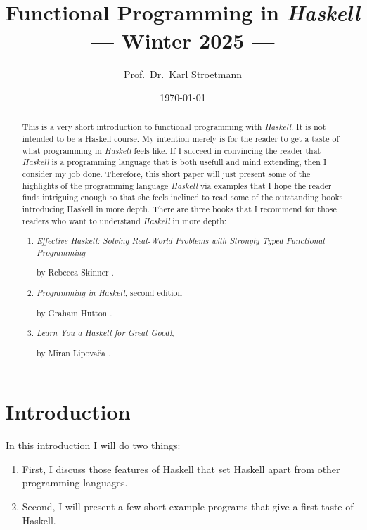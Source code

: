 \documentclass[11pt]{report}
\title{\epsfig{file=dhbw-logo.pdf, scale=1.5}\\[0.3cm]  
       Functional Programming in \textsl{Haskell} \\[0.3cm]
      --- Winter 2025 ---}
\author{Prof.~Dr.~Karl Stroetmann}
\date{\today \\[1.5cm]
  \dangersign \wip \dangersign
}
\begin{document}
\maketitle

\begin{abstract}
\noindent
This is a very short introduction to functional programming with
\href{https://en.wikipedia.org/wiki/Haskell}{\textsl{Haskell}}. 
It is not intended to be a Haskell course.  My intention merely is for the reader to get a taste of what
programming in \textsl{Haskell} feels like.  If I succeed in convincing the reader that \textsl{Haskell} is a
programming language that is both usefull and mind extending, then I consider my job done.
Therefore, this short paper will just present some of the highlights of the programming language
\textsl{Haskell} via examples that I hope the reader finds intriguing enough so that she feels inclined to read
some of the outstanding books introducing Haskell in more depth.  There are three books that I recommend for
those readers who want to understand \textsl{Haskell} in more depth:
\begin{enumerate}
\item \emph{Effective Haskell: Solving Real-World Problems with Strongly Typed Functional Programming} 

      by Rebecca Skinner \cite{skinner:2023}.
\item \emph{Programming in Haskell}, second edition 

      by Graham Hutton \cite{hutton:2016}.
  
\item \emph{Learn You a Haskell for Great Good!},

      by Miran Lipova\v{c}a \cite{lipovaca:2011}.
\end{enumerate}
\end{abstract}

\chapter{Introduction}
In this introduction I will do two things:
\begin{enumerate}
\item First, I discuss those features of Haskell that set Haskell apart from other programming languages.
\item Second, I will present a few short example programs that give a first taste of Haskell.
\end{enumerate}
\end{document}
